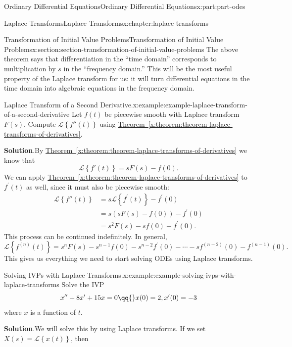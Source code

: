 \documentclass[oneside,10pt,]{book}
\newcommand{\blocktitlefont}{\relax}
\newcommand{\xreffont}{\relax}
\numberwithin{equation}{part}
\newcommand{\Laplace}[1]{\mathcal{L}\left\{#1\right\}}
\newcommand{\amp}{&}
\begin{document}
\begin{partptx}{Ordinary Differential Equations}{}{Ordinary Differential Equations}{}{}{x:part:part-odes}
\begin{chapterptx}{Laplace Transforms}{}{Laplace Transforms}{}{}{x:chapter:laplace-transforms}
\begin{sectionptx}{Transformation of Initial Value Problems}{}{Transformation of Initial Value Problems}{}{}{x:section:section-transformation-of-initial-value-problems}
The above theorem says that differentiation in the ``time domain'' corresponds to multiplication by \(s\) in the ``frequency domain.'' This will be the most useful property of the Laplace transform for us: it will turn differential equations in the time domain into algebraic equations in the frequency domain.%
\begin{example}{Laplace Transform of a Second Derivative.}{x:example:example-laplace-transform-of-a-second-derivative}%
Let \(f(t)\) be piecewise smooth with Laplace transform \(F(s)\). Compute \(\Laplace{f''(t)}\) using \hyperref[x:theorem:theorem-laplace-transforms-of-derivatives]{Theorem~{\xreffont\ref{x:theorem:theorem-laplace-transforms-of-derivatives}}}.%
\par\smallskip%
\noindent\textbf{\blocktitlefont Solution}.\hypertarget{g:solution:idp105548781459744}{}\quad{}By \hyperref[x:theorem:theorem-laplace-transforms-of-derivatives]{Theorem~{\xreffont\ref{x:theorem:theorem-laplace-transforms-of-derivatives}}} we know that%
\begin{equation*}
\Laplace{f'(t)} = sF(s)-f(0).
\end{equation*}
We can apply \hyperref[x:theorem:theorem-laplace-transforms-of-derivatives]{Theorem~{\xreffont\ref{x:theorem:theorem-laplace-transforms-of-derivatives}}} to \(f^\prime(t)\) as well, since it must also be piecewise smooth:%
\begin{align*}
\Laplace{f''(t)} \amp= s\Laplace{f^\prime(t)} - f^\prime(0)\\
\amp= s(sF(s)-f(0)) - f^\prime(0)\\
\amp= s^{2}F(s) - sf(0) - f^\prime(0)\text{.}
\end{align*}
This process can be continued indefinitely. In general,%
\begin{equation*}
\Laplace{f^{(n)}(t)} = s^{n}F(s) - s^{n-1}f(0) - s^{n-2}f^\prime(0) - \cdots -sf^{(n-2)}(0) - f^{(n-1)}(0).
\end{equation*}
This gives us everything we need to start solving ODEs using Laplace transforms.%
\end{example}
\begin{example}{Solving IVPs with Laplace Transforms.}{x:example:example-solving-ivps-with-laplace-transforms}%
Solve the IVP%
\begin{equation*}
x''+8x^\prime+15x = 0 \qq{} x(0) = 2, x^\prime(0) = -3
\end{equation*}
where \(x\) is a function of \(t\).%
\par\smallskip%
\noindent\textbf{\blocktitlefont Solution}.\hypertarget{g:solution:idp105548781399328}{}\quad{}We will solve this by using Laplace transforms. If we set \(X(s) = \Laplace{x(t)}\), then%

\end{example}
\end{sectionptx}
\end{chapterptx}
\end{partptx}
\end{document}

